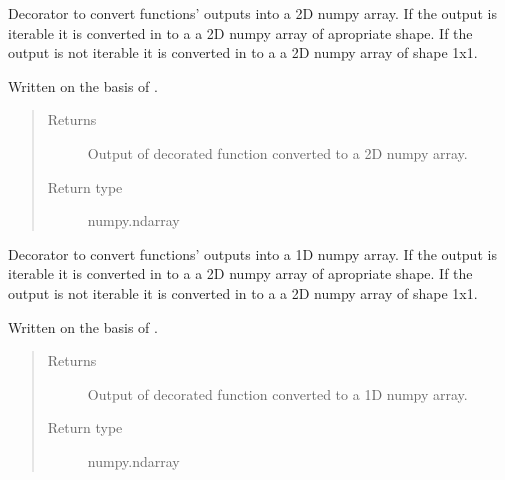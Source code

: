 \documentclass[a4paper,10pt,english]{sphinxmanual}
\begin{document}

\begin{fulllineitems}
\label{aqueduct.utils.helpers:aqueduct.utils.helpers.arrayify}
Decorator to convert functions' outputs into a 2D numpy array. If the output is iterable it is converted in to a a 2D numpy array
of apropriate shape. If the output is not iterable it is converted in to a a 2D numpy array of shape 1x1.

Written on the basis of {\hyperref[aqueduct.utils.helpers:aqueduct.utils.helpers.listify]{}}.
\begin{quote}\begin{description}
\item[{Returns}] \leavevmode
Output of decorated function converted to a 2D numpy array.

\item[{Return type}] \leavevmode
numpy.ndarray

\end{description}\end{quote}

\end{fulllineitems}


\begin{fulllineitems}
\label{aqueduct.utils.helpers:aqueduct.utils.helpers.arrayify1}
Decorator to convert functions' outputs into a 1D numpy array. If the output is iterable it is converted in to a a 2D numpy array
of apropriate shape. If the output is not iterable it is converted in to a a 2D numpy array of shape 1x1.

Written on the basis of {\hyperref[aqueduct.utils.helpers:aqueduct.utils.helpers.listify]{}}.
\begin{quote}\begin{description}
\item[{Returns}] \leavevmode
Output of decorated function converted to a 1D numpy array.

\item[{Return type}] \leavevmode
numpy.ndarray

\end{description}\end{quote}

\end{fulllineitems}
\end{document}
